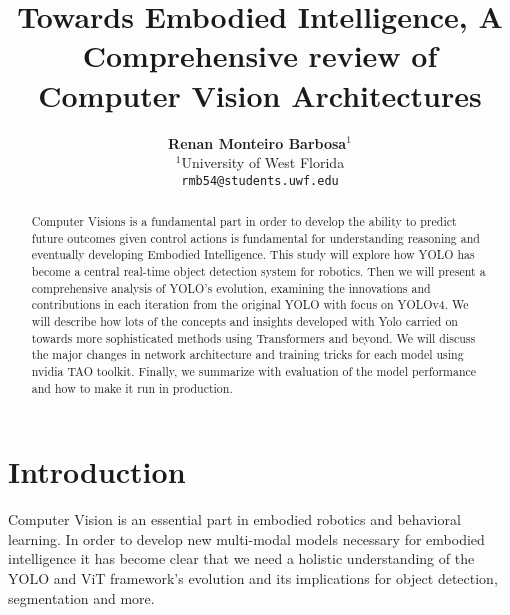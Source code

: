 \documentclass{article}
\title{Towards Embodied Intelligence, A Comprehensive review of Computer Vision Architectures}
\author{
  \textbf{Renan Monteiro Barbosa$^{1}$} \\ 
  $^{1}$University of West Florida \\ 
  \texttt{rmb54@students.uwf.edu}
}
\begin{document}
\maketitle



\begin{abstract}
    Computer Visions is a fundamental part in order to develop the ability to predict future outcomes given control actions is fundamental for understanding reasoning and eventually developing Embodied Intelligence. This study will explore how YOLO has become a central real-time object detection system for robotics. Then we will present a comprehensive analysis of YOLO’s evolution, examining the innovations and contributions in each iteration from the original YOLO with focus on YOLOv4. We will describe how lots of the concepts and insights developed with Yolo carried on towards more sophisticated methods using Transformers and beyond. We will discuss the major changes in network architecture and training tricks for each model using nvidia TAO toolkit. Finally, we summarize with evaluation of the model performance and how to make it run in production.
\end{abstract}


\section{Introduction}


Computer Vision is an essential part in embodied robotics and behavioral learning. In order to develop new multi-modal models necessary for embodied intelligence it has become clear that we need a holistic understanding of the YOLO and ViT framework’s evolution and its implications for object detection, segmentation and more.
\end{document}
